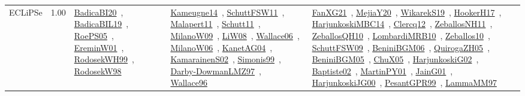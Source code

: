 {\begin{longtable}{p{3cm}r>{\raggedright\arraybackslash}p{6cm}>{\raggedright\arraybackslash}p{6cm}>{\raggedright\arraybackslash}p{8cm}}
\index{ECLiPSe}\index{CPSystems!ECLiPSe}ECLiPSe &  1.00 & \href{../works/BadicaBI20.pdf}{BadicaBI20}~\cite{BadicaBI20}, \href{../works/BadicaBIL19.pdf}{BadicaBIL19}~\cite{BadicaBIL19}, \href{../works/RoePS05.pdf}{RoePS05}~\cite{RoePS05}, \href{../works/EreminW01.pdf}{EreminW01}~\cite{EreminW01}, \href{../works/RodosekWH99.pdf}{RodosekWH99}~\cite{RodosekWH99}, \href{../works/RodosekW98.pdf}{RodosekW98}~\cite{RodosekW98} & \href{../works/Kameugne14.pdf}{Kameugne14}~\cite{Kameugne14}, \href{../works/SchuttFSW11.pdf}{SchuttFSW11}~\cite{SchuttFSW11}, \href{../works/Malapert11.pdf}{Malapert11}~\cite{Malapert11}, \href{../works/Schutt11.pdf}{Schutt11}~\cite{Schutt11}, \href{../works/MilanoW09.pdf}{MilanoW09}~\cite{MilanoW09}, \href{../works/LiW08.pdf}{LiW08}~\cite{LiW08}, \href{../works/Wallace06.pdf}{Wallace06}~\cite{Wallace06}, \href{../works/MilanoW06.pdf}{MilanoW06}~\cite{MilanoW06}, \href{../works/KanetAG04.pdf}{KanetAG04}~\cite{KanetAG04}, \href{../works/KamarainenS02.pdf}{KamarainenS02}~\cite{KamarainenS02}, \href{../works/Simonis99.pdf}{Simonis99}~\cite{Simonis99}, \href{../works/Darby-DowmanLMZ97.pdf}{Darby-DowmanLMZ97}~\cite{Darby-DowmanLMZ97}, \href{../works/Wallace96.pdf}{Wallace96}~\cite{Wallace96} & \href{../works/FanXG21.pdf}{FanXG21}~\cite{FanXG21}, \href{../works/MejiaY20.pdf}{MejiaY20}~\cite{MejiaY20}, \href{../works/WikarekS19.pdf}{WikarekS19}~\cite{WikarekS19}, \href{../works/HookerH17.pdf}{HookerH17}~\cite{HookerH17}, \href{../works/HarjunkoskiMBC14.pdf}{HarjunkoskiMBC14}~\cite{HarjunkoskiMBC14}, \href{../works/Clercq12.pdf}{Clercq12}~\cite{Clercq12}, \href{../works/ZeballosNH11.pdf}{ZeballosNH11}~\cite{ZeballosNH11}, \href{../works/ZeballosQH10.pdf}{ZeballosQH10}~\cite{ZeballosQH10}, \href{../works/LombardiMRB10.pdf}{LombardiMRB10}~\cite{LombardiMRB10}, \href{../works/Zeballos10.pdf}{Zeballos10}~\cite{Zeballos10}, \href{../works/SchuttFSW09.pdf}{SchuttFSW09}~\cite{SchuttFSW09}, \href{../works/BeniniBGM06.pdf}{BeniniBGM06}~\cite{BeniniBGM06}, \href{../works/QuirogaZH05.pdf}{QuirogaZH05}~\cite{QuirogaZH05}, \href{../works/BeniniBGM05.pdf}{BeniniBGM05}~\cite{BeniniBGM05}, \href{../works/ChuX05.pdf}{ChuX05}~\cite{ChuX05}, \href{../works/HarjunkoskiG02.pdf}{HarjunkoskiG02}~\cite{HarjunkoskiG02}, \href{../works/Baptiste02.pdf}{Baptiste02}~\cite{Baptiste02}, \href{../works/MartinPY01.pdf}{MartinPY01}~\cite{MartinPY01}, \href{../works/JainG01.pdf}{JainG01}~\cite{JainG01}, \href{../works/HarjunkoskiJG00.pdf}{HarjunkoskiJG00}~\cite{HarjunkoskiJG00}, \href{../works/PesantGPR99.pdf}{PesantGPR99}~\cite{PesantGPR99}, \href{../works/LammaMM97.pdf}{LammaMM97}~\cite{LammaMM97}\\

\end{longtable}}
